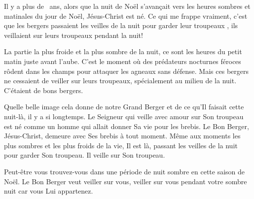 

Il y a plus de ~ans, alors que la nuit de Noël s'avançait vers les heures sombres et matinales du jour de Noël, Jésus-Christ est né. Ce qui me frappe vraiment, c'est que les bergers \Og passaient les veilles de la nuit pour garder leur troupeaux \Fg{}, ils veillaient sur leurs troupeaux pendant la nuit!

La partie la plus froide et la plus sombre de la nuit, ce sont les heures du petit matin juste avant l'aube. C'est le moment où des prédateurs nocturnes féroces rôdent dans les champs pour attaquer les agneaux sans défense. Mais ces bergers ne cessaient de veiller sur leurs troupeaux, spécialement au milieu de la nuit. C'étaient de bons bergers.

Quelle belle image cela donne de notre Grand Berger et de ce qu'Il faisait cette nuit-là, il y a si longtemps. Le Seigneur qui veille avec amour sur Son troupeau est né comme un homme qui allait donner Sa vie pour les brebis. Le Bon Berger, Jésus-Christ, demeure avec Ses brebis à tout moment. Même aux moments les plus sombres et les plus froids de la vie, Il est là, \Og passant les veilles de la nuit pour garder Son troupeau. \Fg{} Il veille sur Son troupeau.

Peut-être vous trouvez-vous dans une période de nuit sombre en cette saison de Noël. Le Bon Berger veut veiller sur vous, veiller sur vous pendant votre sombre nuit car vous Lui appartenez.

\begin{dvquotes}
\end{dvquotes}


